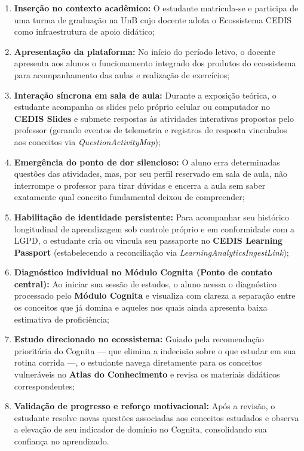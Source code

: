 \begin{enumerate}
    \item \textbf{Inserção no contexto acadêmico:} O estudante matricula-se e participa de uma turma de graduação na UnB cujo docente adota o Ecossistema CEDIS como infraestrutura de apoio didático;
    \item \textbf{Apresentação da plataforma:} No início do período letivo, o docente apresenta aos alunos o funcionamento integrado dos produtos do ecossistema para acompanhamento das aulas e realização de exercícios;
    \item \textbf{Interação síncrona em sala de aula:} Durante a exposição teórica, o estudante acompanha os slides pelo próprio celular ou computador no \textbf{CEDIS Slides} e submete respostas às atividades interativas propostas pelo professor (gerando eventos de telemetria e registros de resposta vinculados aos conceitos via \textit{QuestionActivityMap});
    \item \textbf{Emergência do ponto de dor silencioso:} O aluno erra determinadas questões das atividades, mas, por seu perfil reservado em sala de aula, não interrompe o professor para tirar dúvidas e encerra a aula sem saber exatamente qual conceito fundamental deixou de compreender;
    \item \textbf{Habilitação de identidade persistente:} Para acompanhar seu histórico longitudinal de aprendizagem sob controle próprio e em conformidade com a LGPD, o estudante cria ou vincula seu passaporte no \textbf{CEDIS Learning Passport} (estabelecendo a reconciliação via \textit{LearningAnalyticsIngestLink});
    \item \textbf{Diagnóstico individual no Módulo Cognita (Ponto de contato central):} Ao iniciar sua sessão de estudos, o aluno acessa o diagnóstico processado pelo \textbf{Módulo Cognita} e visualiza com clareza a separação entre os conceitos que já domina e aqueles nos quais ainda apresenta baixa estimativa de proficiência;
    \item \textbf{Estudo direcionado no ecossistema:} Guiado pela recomendação prioritária do Cognita — que elimina a indecisão sobre o que estudar em sua rotina corrida —, o estudante navega diretamente para os conceitos vulneráveis no \textbf{Atlas do Conhecimento} e revisa os materiais didáticos correspondentes;
    \item \textbf{Validação de progresso e reforço motivacional:} Após a revisão, o estudante resolve novas questões associadas aos conceitos estudados e observa a elevação de seu indicador de domínio no Cognita, consolidando sua confiança no aprendizado.
\end{enumerate}

